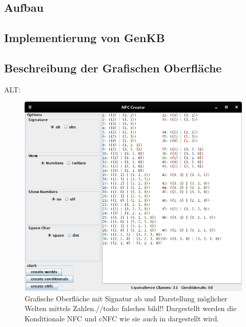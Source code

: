 \documentclass[12pt,a4paper]{article}
\begin{document}
\subsection{Aufbau}
\subsection{Implementierung von GenKB}
\subsection{Beschreibung der Grafischen Oberfläche}





ALT:
\begin{figure}
	\centering
	\includegraphics[width=0.8\linewidth]{bilder/nfc-numbers.png}
	\caption{Grafische Oberfläche mit Signatur {ab} und Darstellung möglicher Welten mittels Zahlen.//todo: falsches bild!! Dargestellt werden die Konditionale NFC und cNFC wie sie auch in \cite{beierle19} dargestellt wird.}
	\label{img:nfc-no-numbers}
\end{figure}
\end{document}
